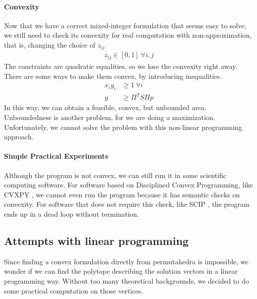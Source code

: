 \documentclass[12pt,letterpaper]{article}
\begin{document}
\paragraph{Convexity}
Now that we have a correct mixed-integer formulation that seems easy to solve, we still need to check its convexity for 
real computation with non-approximation, that is, changing the choice of $z_{ij}$
\begin{align*}
 z_{ij} \in [0, 1] \ \forall i, j
\end{align*}
The constraints are quadratic equalities, so we lose the convexity right away. 
There are some ways to make them convex, by introducing inequalities. 
\begin{align*}
 x_i y_i &\geq 1 \ \forall i \\
 y &\geq \Pi^T S \Pi p
\end{align*}
In this way, we can obtain a feasible, convex, but unbounded area. 
Unboundedness is another problem, for we are doing a maximization. 
Unfortunately, we cannot solve the problem with this non-linear programming approach. 

\paragraph{Simple Practical Experiments}
Although the program is not convex, we can still run it in some scientific computing software.
For software based on Disciplined Convex Programming, like CVXPY \cite{diamond2016cvxpy}, we cannot even run the program 
because it has semantic checks on convexity. For software that does not require this check, like SCIP \cite{BolusaniEtal2024ZR}, the program 
ends up in a dead loop without termination. 

\subsection{Attempts with linear programming}
Since finding a convex formulation directly from permutahedra is impossible, 
we wonder if we can find the polytope describing the solution vectors in a linear programming way.
Without too many theoretical backgrounds, we decided to do some practical computation on those vertices.
\end{document}
